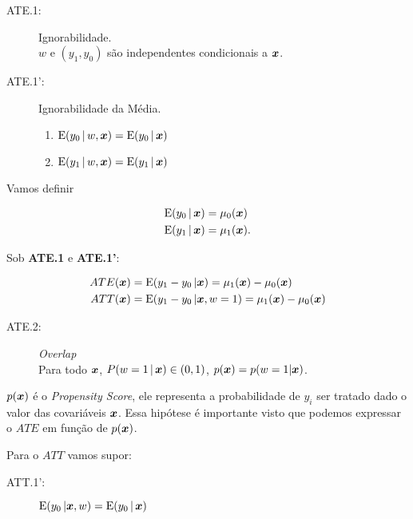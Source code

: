 \documentclass[11pt, oneside, a4paper, article]{article}
\numberwithin{equation}{section}
\begin{document}
\begin{description}
\begin{description}
\item[ATE.1:] Ignorabilidade. 
\\
$w$ e $(y_{1}, y_{0})$ são independentes condicionais a $\boldsymbol{x}$.

\item[ATE.1':] Ignorabilidade da Média. 

\vspace{-.75 em}
\begin{enumerate}[label =\alph*)] \itemsep0pt
\item $\text{E}( y_{0} \, | \, w, \boldsymbol{x} ) = \text{E}( y_{0} \, | \, \boldsymbol{x} )$
\item $\text{E}( y_{1} \, | \, w, \boldsymbol{x} ) = \text{E}( y_{1} \, | \, \boldsymbol{x} )$
\end{enumerate}

\end{description}

Vamos definir

\vspace{-1 em}
\begin{align*}
	\text{E}( y_{0} \, | \, \boldsymbol{x} ) &= \mu_{0}( \boldsymbol{x} )
	\\
	\text{E}( y_{1} \, | \, \boldsymbol{x} ) &= \mu_{1}( \boldsymbol{x} ).
\end{align*}

Sob \textbf{ATE.1} e \textbf{ATE.1'}:

\vspace{-1 em}
\begin{align*}
	ATE( \boldsymbol{x} ) &= \text{E}( y_{1} - y_{0} \, | \boldsymbol{x} ) = \mu_{1}(\boldsymbol{x}) - \mu_{0}(\boldsymbol{x}) 
	\\
	ATT( \boldsymbol{x} ) &= \text{E}( y_{1} - y_{0} \, | \boldsymbol{x}, w=1 ) = \mu_{1}(\boldsymbol{x}) - \mu_{0}(\boldsymbol{x}) 
\end{align*}

\begin{description}
	\item[ATE.2:] \textit{Overlap} \\
		Para todo $\boldsymbol{x}$, $P(w=1 \, | \, \boldsymbol{x} ) \in ( 0, 1 )$, 
		$p(\boldsymbol{x}) = p(w=1 | \boldsymbol{x})$.
\end{description}

$p(\boldsymbol{x})$ é o \textit{Propensity Score}, ele representa a probabilidade de $y_{i}$ ser tratado dado o valor das covariáveis $\boldsymbol{x}$.
Essa hipótese é importante visto que podemos expressar o $ATE$ em função de $p(\boldsymbol{x})$.

\vspace{1 em}
Para o $ATT$ vamos supor:

\begin{description}
	\item[ATT.1':] 
		$\text{E}( y_{0} \, | \boldsymbol{x}, w ) = \text{E}( y_{0} \, | \, \boldsymbol{x} )$


\end{description}
\end{description}
\end{document}
